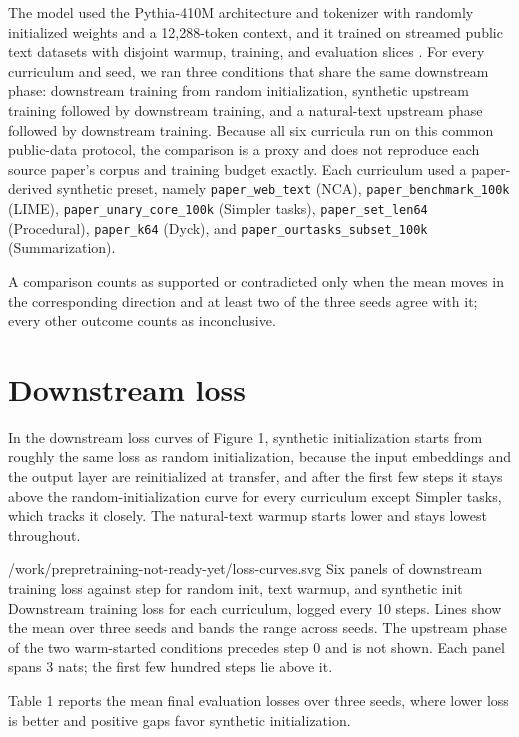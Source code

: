 \documentclass[11pt]{article}
\begin{document}
The model used the Pythia-410M architecture and tokenizer with randomly initialized weights and a 12,288-token context, and it trained on streamed public text datasets with disjoint warmup, training, and evaluation slices \cite{biderman2023}. For every curriculum and seed, we ran three conditions that share the same downstream phase: downstream training from random initialization, synthetic upstream training followed by downstream training, and a natural-text upstream phase followed by downstream training. Because all six curricula run on this common public-data protocol, the comparison is a proxy and does not reproduce each source paper's corpus and training budget exactly. Each curriculum used a paper-derived synthetic preset, namely \texttt{paper\_web\_text} (NCA), \texttt{paper\_benchmark\_100k} (LIME), \texttt{paper\_unary\_core\_100k} (Simpler tasks), \texttt{paper\_set\_len64} (Procedural), \texttt{paper\_k64} (Dyck), and \texttt{paper\_ourtasks\_subset\_100k} (Summarization).

A comparison counts as supported or contradicted only when the mean moves in the corresponding direction and at least two of the three seeds agree with it; every other outcome counts as inconclusive.

\section{Downstream loss}\label{loss}

In the downstream loss curves of Figure 1, synthetic initialization starts from roughly the same loss as random initialization, because the input embeddings and the output layer are reinitialized at transfer, and after the first few steps it stays above the random-initialization curve for every curriculum except Simpler tasks, which tracks it closely. The natural-text warmup starts lower and stays lowest throughout.

  {/work/prepretraining-not-ready-yet/loss-curves.svg}
  {Six panels of downstream training loss against step for random init, text warmup, and synthetic init}
  {Downstream training loss for each curriculum, logged every 10 steps. Lines show the mean over three seeds and bands the range across seeds. The upstream phase of the two warm-started conditions precedes step 0 and is not shown. Each panel spans 3 nats; the first few hundred steps lie above it.}

Table 1 reports the mean final evaluation losses over three seeds, where lower loss is better and positive gaps favor synthetic initialization.
\end{document}
